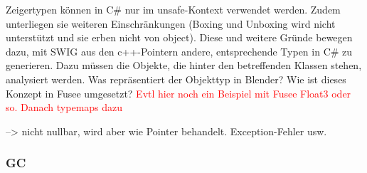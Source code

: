 %
	

Zeigertypen können in C\# nur im unsafe-Kontext verwendet werden. Zudem unterliegen sie weiteren Einschränkungen (Boxing und Unboxing wird nicht unterstützt und sie erben nicht von object). Diese und weitere Gründe bewegen dazu, mit SWIG aus den c++-Pointern andere, entsprechende Typen in C\# zu generieren. Dazu müssen die Objekte, die hinter den betreffenden Klassen stehen, analysiert werden. Was repräsentiert der Objekttyp in Blender? Wie ist dieses Konzept in Fusee umgesetzt? \textcolor{red}{Evtl hier noch ein Beispiel mit Fusee Float3 oder so. Danach typemaps dazu}

--> nicht nullbar, wird aber wie Pointer behandelt. Exception-Fehler usw.




\subsubsection{GC}\label{subsubsec:GC}
